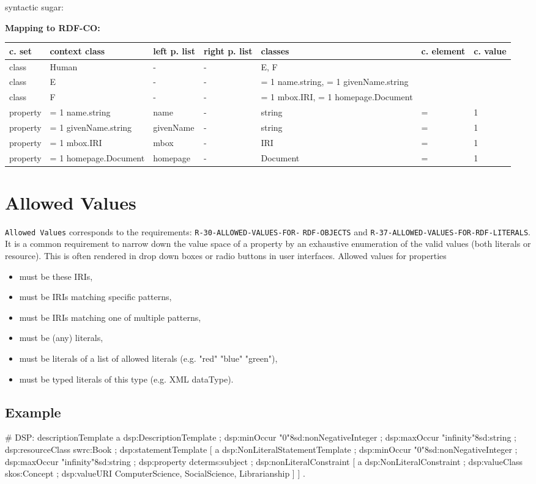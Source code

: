\documentclass{llncs}
\newcommand{\ms}[1]{\texttt{#1}}
\newenvironment{gcotable}{
  \scriptsize
  \sffamily
  \vspace{0cm}
	\begin{center}
	\textbf{\vspace{0.4cm}Mapping to RDF-CO:} \\
  \begin{tabular}{l|l|l|l|l|l|l}
	\hline
  \textbf{c. set} & \textbf{context class} & \textbf{left p. list} & \textbf{right p. list} & \textbf{classes} & \textbf{c. element} & \textbf{c. value} \\
  \hline

}{
  \hline
  \end{tabular}
	\end{center}
}
\begin{document}
syntactic sugar:

\begin{gcotable}
class & Human & - & - & E, F &  \\
class & E & - & - & = 1 name.string, = 1 givenName.string &  \\
class & F & - & - & = 1 mbox.IRI, = 1 homepage.Document &  \\
property & = 1 name.string & name & - & string & = & 1 \\
property & = 1 givenName.string & givenName & - & string & = & 1 \\
property & = 1 mbox.IRI & mbox & - & IRI & = & 1 \\
property & = 1 homepage.Document & homepage & - & Document & = & 1 \\
\end{gcotable}

\section{Allowed Values}

\ms{Allowed Values} corresponds to the requirements:
\ms{R-30-ALLOWED-VALUES-FOR-} \ms{RDF-OBJECTS} and 
\ms{R-37-ALLOWED-VALUES-FOR-RDF-LITERALS}.
It is a common requirement to narrow down the value space of a property by an exhaustive enumeration of the valid values (both literals or resource). This is often rendered in drop down boxes or radio buttons in user interfaces. 
Allowed values for properties
\begin{itemize}
	\item must be these IRIs,
  \item must be IRIs matching specific patterns,
  \item must be IRIs matching one of multiple patterns,
  \item must be (any) literals,
  \item must be literals of a list of allowed literals (e.g. "red" "blue" "green"),
  \item must be typed literals of this type (e.g. XML dataType).
\end{itemize}

\subsection{Example}

\begin{ex}
# DSP:
descriptionTemplate 
    a dsp:DescriptionTemplate ;
    dsp:minOccur "0"^^xsd:nonNegativeInteger ; 
    dsp:maxOccur "infinity"^^xsd:string ; 
    dsp:resourceClass swrc:Book ; 
    dsp:statementTemplate [
        a dsp:NonLiteralStatementTemplate ;
        dsp:minOccur "0"^^xsd:nonNegativeInteger ; 
        dsp:maxOccur "infinity"^^xsd:string ; 
        dsp:property dcterms:subject ; 
        dsp:nonLiteralConstraint [ 
            a dsp:NonLiteralConstraint ;
            dsp:valueClass skos:Concept ;
            dsp:valueURI ComputerScience, SocialScience, Librarianship ] ] .
\end{ex}
\end{document}
